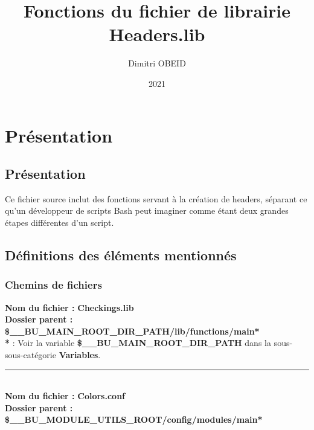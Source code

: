 \documentclass[a4paper,10pt]{article}
\title{\color{red}Fonctions du fichier de librairie \color{lime}Headers.lib}\color{white}
\author{Dimitri OBEID}
\date{2021}
\begin{document}
 \maketitle
 \tableofcontents
 \newpage

\color{red}
\section{Présentation}\color{white}

\color{green}
\subsection{Présentation}\color{white}
Ce fichier source inclut des fonctions servant à la création de headers, séparant ce qu'un développeur de scripts Bash peut imaginer comme étant deux grandes étapes différentes d'un script.\\[1\baselineskip]

\color{green}
\subsection{Définitions des éléments mentionnés}\color{white}

\color{blue}
\subsubsection{Chemins de fichiers}\color{white}
\textbf{Nom du fichier :} \textbf{\color{lime}Checkings.lib\color{white}}\\[1\baselineskip]
\textbf{Dossier parent :} \textbf{\color{lime}\$\_\_BU\_MAIN\_ROOT\_DIR\_PATH/lib/functions/main\color{white}*}\\[1\baselineskip]

\textbf{*} : Voir la variable \textbf{\color{orange}\$\_\_BU\_MAIN\_ROOT\_DIR\_PATH\color{white}} dans la sous-sous-catégorie \textbf{\color{blue}Variables\color{white}}.\\[1\baselineskip]



\color{lime}\par\noindent\rule{\textwidth}{0.4pt}\color{white}\\[1\baselineskip]

\textbf{Nom du fichier :} \textbf{\color{lime}Colors.conf\color{white}}\\[1\baselineskip]
\textbf{Dossier parent :} \textbf{\color{lime}\$\_\_BU\_MODULE\_UTILS\_ROOT/config/modules/main\color{white}*}\\[1\baselineskip]
\end{document}
